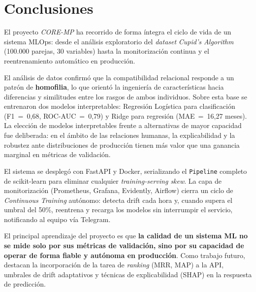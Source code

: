 \setcounter{secnumdepth}{-1}

\chapter{Conclusiones}
\label{cap:conclusiones}

El proyecto \textit{CORE-MP} ha recorrido de forma íntegra el ciclo de vida de un sistema MLOps: desde el análisis exploratorio del \textit{dataset} \textit{Cupid's Algorithm} (100.000 parejas, 30 variables) hasta la monitorización continua y el reentrenamiento automático en producción.

El análisis de datos confirmó que la compatibilidad relacional responde a un patrón de \textbf{homofilia}, lo que orientó la ingeniería de características hacia diferencias y similitudes entre los rasgos de ambos individuos. Sobre esta base se entrenaron dos modelos interpretables: Regresión Logística para clasificación (F1~=~0{,}68, ROC-AUC~=~0{,}79) y Ridge para regresión (MAE~=~16{,}27 meses). La elección de modelos interpretables frente a alternativas de mayor capacidad fue deliberada: en el ámbito de las relaciones humanas, la explicabilidad y la robustez ante distribuciones de producción tienen más valor que una ganancia marginal en métricas de validación.

El sistema se desplegó con FastAPI y Docker, serializando el \texttt{Pipeline} completo de scikit-learn para eliminar cualquier \textit{training-serving skew}. La capa de monitorización (Prometheus, Grafana, Evidently, Airflow) cierra un ciclo de \textit{Continuous Training} autónomo: detecta drift cada hora y, cuando supera el umbral del 50\%, reentrena y recarga los modelos sin interrumpir el servicio, notificando al equipo vía Telegram.

El principal aprendizaje del proyecto es que \textbf{la calidad de un sistema ML no se mide solo por sus métricas de validación, sino por su capacidad de operar de forma fiable y autónoma en producción}. Como trabajo futuro, destacan la incorporación de la tarea de \textit{ranking} (MRR, MAP) a la API, umbrales de drift adaptativos y técnicas de explicabilidad (SHAP) en la respuesta de predicción.

